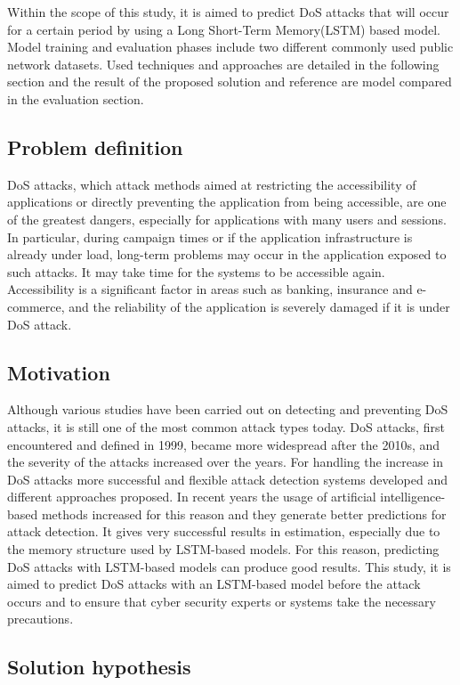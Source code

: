 \documentclass{article}
\begin{document}
Within the scope of this study, it is aimed to predict DoS attacks that will occur for a certain period by using a Long Short-Term Memory(LSTM) based model. Model training and evaluation phases include two different commonly used public network datasets. Used techniques and approaches are detailed in the following section and the result of the proposed solution and reference are model compared in the evaluation section. 

\subsection{Problem definition}
DoS attacks, which attack methods aimed at restricting the accessibility of applications or directly preventing the application from being accessible, are one of the greatest dangers, especially for applications with many users and sessions. In particular, during campaign times or if the application infrastructure is already under load, long-term problems may occur in the application exposed to such attacks. It may take time for the systems to be accessible again. Accessibility is a significant factor in areas such as banking, insurance and e-commerce, and the reliability of the application is severely damaged if it is under DoS attack.

\subsection{Motivation}
Although various studies have been carried out on detecting and preventing DoS attacks, it is still one of the most common attack types today. DoS attacks, first encountered and defined in 1999, became more widespread after the 2010s, and the severity of the attacks increased over the years\cite{Rangapur}. For handling the increase in DoS attacks more successful and flexible attack detection systems developed and different approaches proposed. In recent years the usage of artificial intelligence-based methods increased for this reason and they generate better predictions for attack detection. It gives very successful results in estimation, especially due to the memory structure used by LSTM-based models. For this reason, predicting DoS attacks with LSTM-based models can produce good results. This study, it is aimed to predict DoS attacks with an LSTM-based model before the attack occurs and to ensure that cyber security experts or systems take the necessary precautions.

\subsection{Solution hypothesis}
\end{document}
